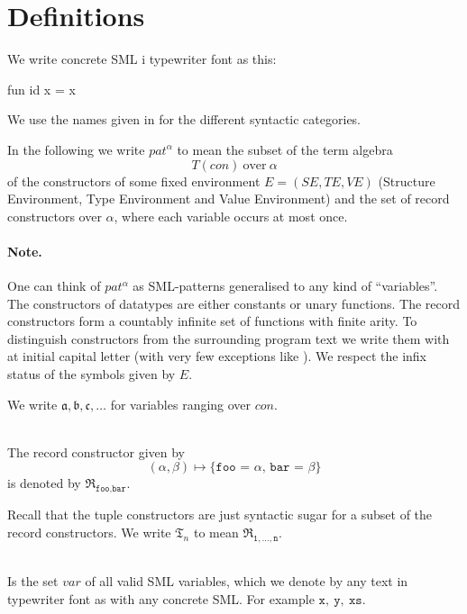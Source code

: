 \section{Definitions}
We write concrete SML i typewriter font as this:
\begin{sml}
fun id x = x
\end{sml}

We use the names given in \cite{SML97} for the different syntactic categories.

\begin{definition}
  In the following we write $pat^\alpha$ to mean the subset of the term algebra
  \[
  T(con)\ \text{over}\ \alpha
  \]
  of the constructors of some fixed environment $E = (S\!E, T\!E, V\!E)$
  (Structure Environment, Type Environment and Value Environment) and the set of
  record constructors over $\alpha$, where each variable occurs at most
  once. 

\end{definition}

\paragraph{Note.} One can think of $pat^\alpha$ as SML-patterns generalised to
any kind of ``variables''. The constructors of datatypes are either constants or
unary functions. The record constructors form a countably infinite set of
functions with finite arity. To distinguish constructors from the surrounding
program text we write them with at initial capital letter (with very few
exceptions like \codeinline{::} ). We respect the infix status
of the symbols given by $E$.

We write $\mathfrak{a}, \mathfrak{b}, \mathfrak{c}, \ldots$ for variables ranging
over $con$.

\begin{definition} \ \\
  The record constructor given by
  \[
  (\alpha, \beta) \mapsto \texttt{\{foo = $\alpha$, bar = $\beta$\}}
  \]
  is denoted by $\mathfrak{R}_{\texttt{foo},\texttt{bar}}$.

  Recall that the tuple constructors are just syntactic sugar for a subset of
  the record constructors. We write $\mathfrak{T}_n$ to mean
  $\mathfrak{R}_{\texttt{1},\ldots,\texttt{n}}$.
\end{definition}

\begin{definition} \ \\
  Is the set $var$ of all valid SML variables, which we denote by any text in
  typewriter font as with any concrete SML. For example $\mathtt{x},\
  \mathtt{y},\ \mathtt{xs}$.
\end{definition}

